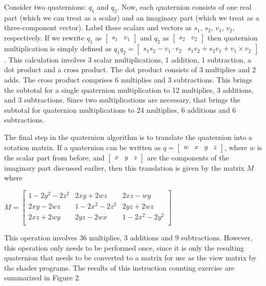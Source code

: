 \documentclass{acm_proc_article-sp}
\begin{document}
Consider two quaternions: $q_1$ and $q_2$.
Now, each quaternion consists of one real part (which we can treat as a scalar) and an imaginary part (which we treat as a three-component vector).
Label these scalars and vectors as $s_1$, $s_2$, $v_1$, $v_2$, respectively.
If we rewrite $q_1$ as $\left[ \begin{array}{cc} s_1 & v_1 \end{array} \right]$ and $q_2$ as $\left[ \begin{array}{cc} s_2 & v_2 \end{array} \right]$ then quaternion multiplication is simply defined as $q_1 q_2 = \left[ \begin{array}{cc} s_1 s_2 - v_1 \cdot v_2 & s_1 v_2 + s_2 v_1 + v_1 \times v_2 \end{array} \right]$ \parencite{schoemake85}.
This calculation involves 3 scalar multiplications, 1 addition, 1 subtraction, a dot product and a cross product.
The dot product consists of 3 multiplies and 2 adds.
The cross product comprises 6 multiplies and 3 subtractions.
This brings the subtotal for a single quaternion multiplication to 12 multiplies, 3 additions, and 3 subtractions.
Since two multiplications are necessary, that brings the subtotal for quaternion multiplications to 24 multiplies, 6 additions and 6 subtractions.

The final step in the quaternion algorithm is to translate the quaternion into a rotation matrix.
If a quaternion can be written as $q = \left[ \begin{array}{cccc} w & x & y & z \end{array} \right]$, where $w$ is the scalar part from before, and $\left[ \begin{array}{ccc} x & y & z \end{array} \right]$ are the components of the imaginary part discussed earlier, then this translation is given by the matrix $M$ where

$M = \left[ \begin{array}{ccc}
    1 - 2y^2 - 2z^2 & 2xy + 2wz & 2xz - wy \\
    2xy - 2wz & 1 - 2x^2 - 2z^2 & 2yz + 2wz \\
    2xz + 2wy & 2yz - 2wx & 1 - 2x^2 - 2y^2 \\
    \end{array}\right]$

This operation involves 36 multiplies, 3 additions and 9 subtractions.
However, this operation only needs to be performed once, since it is only the resulting quaternion that needs to be converted to a matrix for use as the view matrix by the shader programs.
The results of this instruction counting exercise are summarized in Figure 2.
\end{document}
